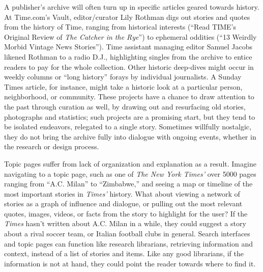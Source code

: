 A publisher's archive will often turn up in specific articles geared towards history. At Time.com's Vault, editor/curator Lily Rothman digs out stories and quotes from the history of Time, ranging from historical interests (``Read TIME's Original Review of \emph{The Catcher in the Rye}'') to ephemeral oddities (``13 Weirdly Morbid Vintage News Stories''). Time assistant managing editor Samuel Jacobs likened Rothman to a radio D.J., highlighting singles from the archive to entice readers to pay for the whole collection.\autocite{levy_time.com_2014} Other historic deep-dives might occur in weekly columns or ``long history'' forays by individual journalists. A Sunday Times article, for instance, might take a historic look at a particular person, neighborhood, or community. These projects have a chance to draw attention to the past through curation as well, by drawing out and resurfacing old stories, photographs and statistics; such projects are a promising start, but they tend to be isolated endeavors, relegated to a single story. Sometimes willfully nostalgic, they do not bring the archive fully into dialogue with ongoing events, whether in the research or design process.


Topic pages suffer from lack of organization and explanation as a result. Imagine navigating to a topic page, such as one of \emph{The New York Times'} over 5000 pages ranging from ``A.C. Milan'' to ``Zimbabwe,'' and seeing a map or timeline of the most important stories in \emph{Times'} history. What about viewing a network of stories as a graph of influence and dialogue, or pulling out the most relevant quotes, images, videos, or facts from the story to highlight for the user? If the \emph{Times} hasn't written about A.C. Milan in a while, they could suggest a story about a rival soccer team, or Italian football clubs in general. Search interfaces and topic pages can function like research librarians, retrieving information and context, instead of a list of stories and items. Like any good librarians, if the information is not at hand, they could point the reader towards where to find it.

